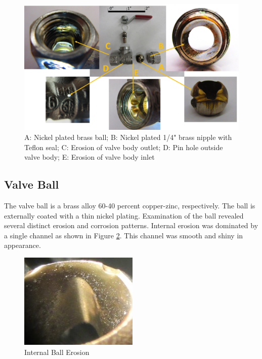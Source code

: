 \documentclass[]{article}
\begin{document}
\begin{figure}[htbp]
	\centering
	\includegraphics[width=0.95\linewidth]{Photos/Exploded_Callouts}
	\caption{A: Nickel plated brass ball; B: Nickel plated 1/4" brass nipple with Teflon seal; C: Erosion of valve body outlet; D: Pin hole outside valve body; E: Erosion of valve body inlet}
	\label{fig:Ball_Valve_as_Recieved}
\end{figure}
\subsection{Valve Ball}
The valve ball is a brass alloy 60-40 percent copper-zinc, respectively. The ball is externally coated with a thin nickel plating. Examination of the ball revealed several distinct erosion and corrosion patterns. Internal erosion was dominated by a single channel as shown in Figure \ref{fig:internalballerossion}. This channel was smooth and shiny in appearance. 
\begin{figure}[h]
	\centering
	\includegraphics[width=0.4\linewidth]{Photos/internal_ball_erossion}
	\caption{Internal Ball Erosion}
	\label{fig:internalballerossion}
\end{figure}
\end{document}
